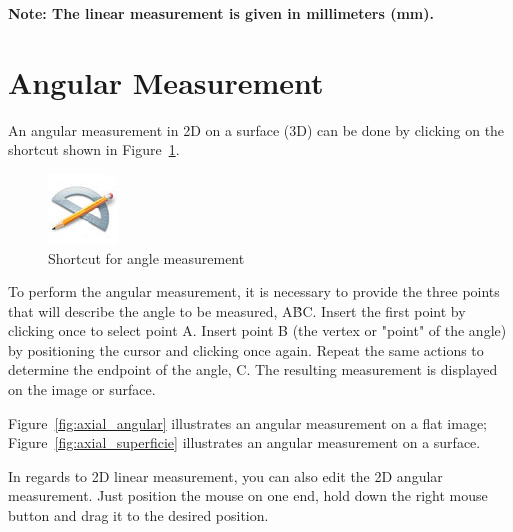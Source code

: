 \textbf{Note: The linear measurement is given in millimeters (mm).}

\section{Angular Measurement}

An angular measurement in 2D on a surface (3D) can be done by clicking on the shortcut shown in Figure~\ref{fig:atalho_angular}.

\begin{figure}[!htb]
\centering
\includegraphics[scale=0.2]{../user_guide_figures/icons/measure_angle_original.jpg}
\caption{Shortcut for angle measurement}
\label{fig:atalho_angular}
\end{figure}

To perform the angular measurement, it is necessary to provide the three points that will describe the angle to be measured, A\^{B}C. Insert the first point by clicking once to select point A. Insert point B (the vertex or "point" of the angle) by positioning the cursor and clicking once again. Repeat the same actions to determine the endpoint of the angle, C. The resulting measurement is displayed on the image or surface.

Figure~\ref{fig:axial_angular} illustrates an angular measurement on a flat image; Figure~\ref{fig:axial_superficie} illustrates an angular measurement on a surface.

In regards to 2D linear measurement, you can also edit the 2D angular measurement. Just position the mouse on one end, hold down the right mouse button and drag it to the desired position.

